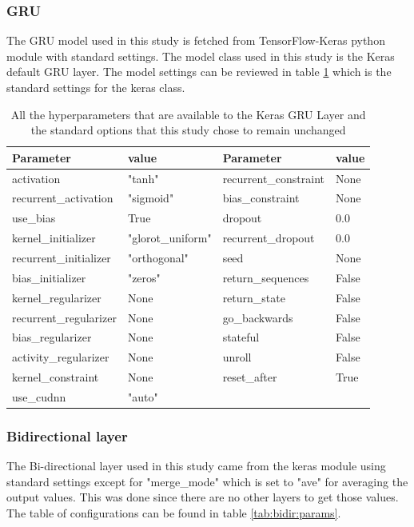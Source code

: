 \subsubsection{GRU}

The GRU model used in this study is fetched from TensorFlow-Keras python module with standard settings. The model class used in this study is the Keras default GRU layer. The model settings can be reviewed in table \ref{tab:gru:params} which is the standard settings for the keras class.

\begin{table}
	\centering
	\begin{tabular}{l|l|l|l}
		Parameter&value&Parameter&value\\\hline
		activation&"tanh"&recurrent\_constraint&None\\
		recurrent\_activation&"sigmoid"&bias\_constraint&None\\
		use\_bias&True&dropout&0.0\\
		kernel\_initializer&"glorot\_uniform"&recurrent\_dropout&0.0\\
		recurrent\_initializer&"orthogonal"&seed&None\\
		bias\_initializer&"zeros"&return\_sequences&False\\
		kernel\_regularizer&None&return\_state&False\\
		recurrent\_regularizer&None&go\_backwards&False\\
		bias\_regularizer&None&stateful&False\\
		activity\_regularizer&None&unroll&False\\
		kernel\_constraint&None&reset\_after&True\\
		use\_cudnn&"auto"&&
	\end{tabular}
	\caption[GRU standard parameters]{All the hyperparameters that are available to the Keras GRU Layer and the standard options that this study chose to remain unchanged}
	\label{tab:gru:params}
\end{table}

\subsubsection{Bidirectional layer}

The Bi-directional layer used in this study came from the keras module using standard settings except for "merge\_mode" which is set to "ave" for averaging the output values. This was done since there are no other layers to get those values. The table of configurations can be found in table \ref{tab:bidir:params}.

